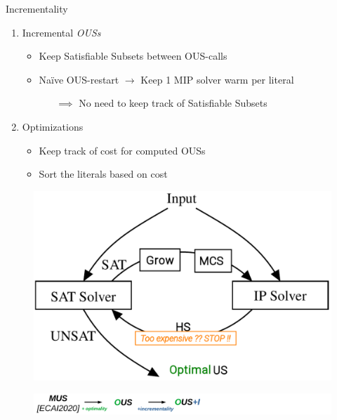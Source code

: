 \documentclass{beamer}
\begin{document}
\begin{frame}{Incrementality}

	\begin{minipage}{0.59\textwidth}
		\begin{enumerate}
			\item Incremental \emph{OUSs}
\begin{itemize}
	\item Keep Satisfiable Subsets between OUS-calls
	\item Naïve OUS-restart $\rightarrow$ Keep 1 MIP solver warm per literal
	\begin{itemize}
		\item[$\implies$] No need to keep track of Satisfiable Subsets
	\end{itemize}

\end{itemize}
\item Optimizations
\begin{itemize}
			\item Keep track of cost for computed OUSs
	\item Sort the literals based on cost
\end{itemize}
\end{enumerate}
\end{minipage}
\begin{minipage}{0.4\textwidth}
	\begin{figure}
		\includegraphics[width=\textwidth]{ihs_cost.png}
	\end{figure}
\end{minipage}\pause
\begin{figure}
	\includegraphics[width=\textwidth]{mus_to_ous_i.png}

\end{figure}
\end{frame}
\end{document}
